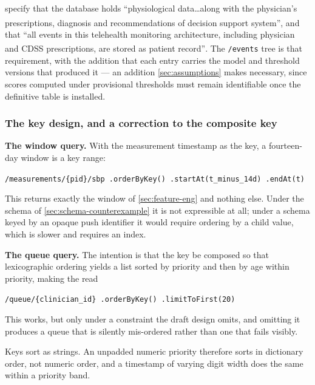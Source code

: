 \documentclass[12pt,a4paper,oneside]{report}
\newcommand{\bq}[1]{``#1''\textsuperscript{\dag}}
\begin{document}
\Textcite{yazdani2018} specify that the database holds \bq{physiological data\ldots along with the physician's prescriptions, diagnosis and recommendations of decision support system}, and that \bq{all events in this telehealth monitoring architecture, including physician and CDSS prescriptions, are stored as patient record}. The \texttt{/events} tree is that requirement, with the addition that each entry carries the model and threshold versions that produced it --- an addition \cref{sec:assumptions} makes necessary, since scores computed under provisional thresholds must remain identifiable once the definitive table is installed.

\subsubsection{The key design, and a correction to the composite key}\label{sec:key-design}

\textbf{The window query.} With the measurement timestamp as the key, a fourteen-day window is a key range:

\begin{center}\small
\texttt{/measurements/\{pid\}/sbp .orderByKey() .startAt(t\_minus\_14d) .endAt(t)}
\end{center}

This returns exactly the window of \cref{sec:feature-eng} and nothing else. Under the schema of \cref{sec:schema-counterexample} it is not expressible at all; under a schema keyed by an opaque push identifier it would require ordering by a child value, which is slower and requires an index.

\textbf{The queue query.} The intention is that the key be composed so that lexicographic ordering yields a list sorted by priority and then by age within priority, making the read

\begin{center}\small
\texttt{/queue/\{clinician\_id\} .orderByKey() .limitToFirst(20)}
\end{center}

This works, but only under a constraint the draft design omits, and omitting it produces a queue that is silently mis-ordered rather than one that fails visibly.

Keys sort as strings. An unpadded numeric priority therefore sorts in dictionary order, not numeric order, and a timestamp of varying digit width does the same within a priority band.
\end{document}
